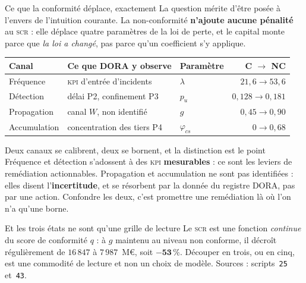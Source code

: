 \documentclass[11pt]{beamer}
\begin{document}
\begin{frame}{Ce que la conformité déplace, exactement}
\scriptsize
La question mérite d'être posée à l'envers de l'intuition courante. La non-conformité
\textbf{n'ajoute aucune pénalité} au \textsc{scr} : elle déplace quatre paramètres de la loi de
perte, et le capital monte parce que \emph{la loi a changé}, pas parce qu'un coefficient s'y
applique.
\vspace{-1mm}
\begin{center}\scriptsize
\begin{tabular}{@{}l l l r@{}}
\toprule
\textbf{Canal} & \textbf{Ce que DORA y observe} & \textbf{Paramètre} & \textbf{C $\to$ NC} \\
\midrule
Fréquence & \textsc{kpi} d'entrée d'incidents & $\lambda$ & $21{,}6 \to 53{,}6$ \\
Détection & délai P2, confinement P3 & $p_u$ & $0{,}128 \to 0{,}181$ \\
Propagation & canal $W$, non identifié & $g$ & $0{,}45 \to 0{,}90$ \\
Accumulation & concentration des tiers P4 & $\varphi_{cs}$ & $0 \to 0{,}68$ \\
\bottomrule
\end{tabular}
\end{center}
\vspace{-1mm}
\begin{block}{Deux canaux se calibrent, deux se bornent, et la distinction est le point}
Fréquence et détection s'adossent à des \textsc{kpi} \textbf{mesurables} : ce sont les leviers
de remédiation actionnables. Propagation et accumulation ne sont pas identifiées : elles disent
l'\textbf{incertitude}, et se résorbent par la donnée du registre DORA, pas par une action.
Confondre les deux, c'est promettre une remédiation là où l'on n'a qu'une borne.
\end{block}
\vspace{-1mm}
\begin{block}{Et les trois états ne sont qu'une grille de lecture}
Le \textsc{scr} est une fonction \emph{continue} du score de conformité $q$ : à $g$ maintenu au
niveau non conforme, il décroît régulièrement de $16\,847$ à $7\,987$~M\euro, soit
$\mathbf{-53\,\%}$. Découper en trois, ou en cinq, est une commodité de lecture et non un choix
de modèle. Sources : scripts~\texttt{25} et~\texttt{43}.
\end{block}
\end{frame}
\end{document}
